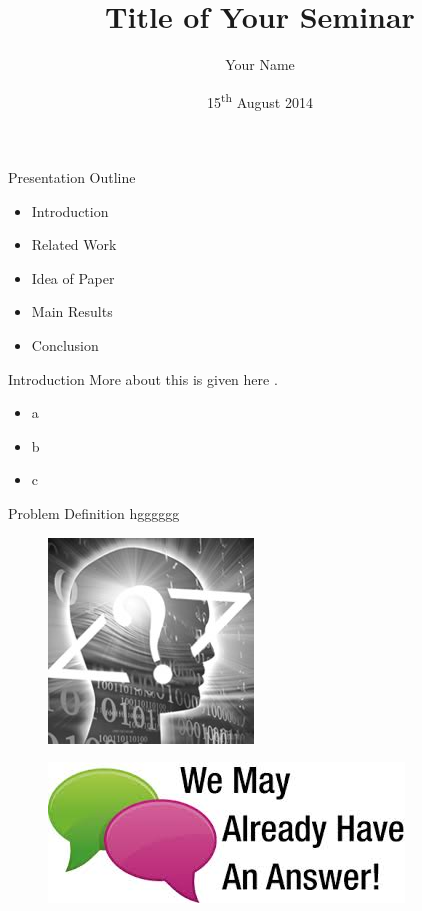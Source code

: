 \documentclass{beamer}
\title[Short Title of Seminar \hspace{25mm} \insertframenumber/\inserttotalframenumber]{Title of Your Seminar}
\author{Your Name}
\date{15\textsuperscript{th} August 2014}
\institute[Department of Information and Communication Technology,MIT,Manipal]
{Department of Information and Communication Technology\\ MIT Manipal}
\begin{document}
\begin{frame}
\titlepage
\end{frame}

\begin{frame}{Presentation Outline}
	\begin{itemize}
	\item Introduction
	\item Related Work
	\item Idea of Paper
	\item Main Results
	\item Conclusion
	\end{itemize}
\end{frame}

\begin{frame}{Introduction}
More about this is given here .
	\begin{itemize}
	\item a
	\item b
	\item c
	\end{itemize}
\end{frame}

\begin{frame}
	\begin{block}{Problem Definition}
	hgggggg
	\end{block}
\end{frame}
\begin{frame}
	\begin{figure}
	\includegraphics{QandA/QandA1}
	\end{figure}
\end{frame}
\begin{frame}
	\begin{figure}
	\includegraphics{QandA/QandA2}
	\end{figure}
\end{frame}
\end{document}
